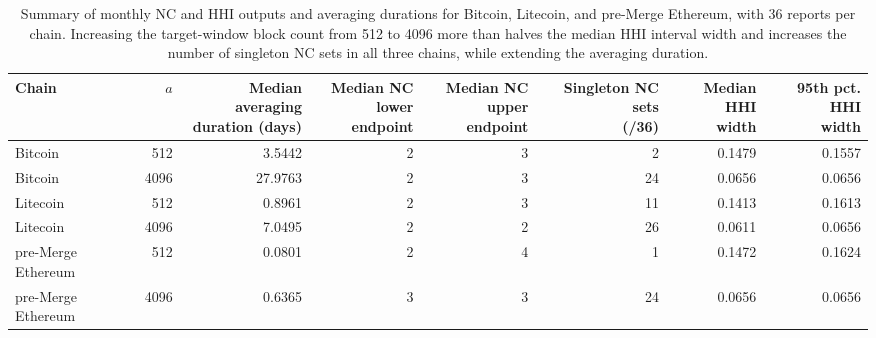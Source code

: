 \begin{table}[!t]
\centering
\small
\caption{Summary of monthly NC and HHI outputs and averaging durations for Bitcoin, Litecoin, and pre-Merge Ethereum, with 36 reports per chain. Increasing the target-window block count from 512 to 4096 more than halves the median HHI interval width and increases the number of singleton NC sets in all three chains, while extending the averaging duration.}
\label{tab:compact-empirical}
\setlength{\tabcolsep}{4pt}
\begin{tabular}{lrrrrrrr}
\toprule
Chain & $a$ & \shortstack{Median averaging\\duration (days)} & \shortstack{Median NC\\lower endpoint} & \shortstack{Median NC\\upper endpoint} & \shortstack{Singleton NC sets\\(/36)} & \shortstack{Median HHI\\width} & \shortstack{95th pct. HHI\\width} \\
\midrule
Bitcoin & 512 & 3.5442 & 2 & 3 & 2 & 0.1479 & 0.1557 \\
Bitcoin & 4096 & 27.9763 & 2 & 3 & 24 & 0.0656 & 0.0656 \\
Litecoin & 512 & 0.8961 & 2 & 3 & 11 & 0.1413 & 0.1613 \\
Litecoin & 4096 & 7.0495 & 2 & 2 & 26 & 0.0611 & 0.0656 \\
pre-Merge Ethereum & 512 & 0.0801 & 2 & 4 & 1 & 0.1472 & 0.1624 \\
pre-Merge Ethereum & 4096 & 0.6365 & 3 & 3 & 24 & 0.0656 & 0.0656 \\
\bottomrule
\end{tabular}
\end{table}
